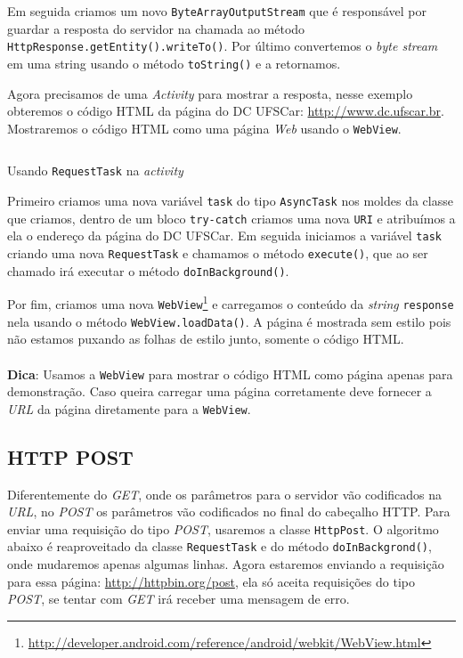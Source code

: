 \documentclass[a4paper,12pt,brazil,oneside]{book}
\begin{document}
\begin{singlespace}
		Em seguida criamos um novo \texttt{ByteArrayOutputStream} que é responsável por guardar a resposta do servidor na chamada ao método \texttt{HttpResponse.getEntity().writeTo()}. Por último convertemos o \emph{byte stream} em uma string usando o método \texttt{toString()} e a retornamos.

		Agora precisamos de uma \emph{Activity} para mostrar a resposta, nesse exemplo obteremos o código HTML da página do DC UFSCar: \href{http://www.dc.ufscar.br}{http://www.dc.ufscar.br}. Mostraremos o código HTML como uma página \emph{Web} usando o \texttt{WebView}.

		\begin{listing}[H]
		\inputminted[linenos=true,fontsize=\small,frame=lines, framesep=2mm, tabsize=2,numbersep=5pt]{java}{src/api/comm/httpget.java}
		\caption{Usando \texttt{RequestTask} na \emph{activity}}
		\label{code:requestactivity}
		\end{listing}		

		Primeiro criamos uma nova variável \texttt{task} do tipo \texttt{AsyncTask} nos moldes da classe que criamos, dentro de um bloco \texttt{try-catch} criamos uma nova \texttt{URI} e atribuímos a ela o endereço da página do DC UFSCar. Em seguida iniciamos a variável \texttt{task} criando uma nova \texttt{RequestTask} e chamamos o método \texttt{execute()}, que ao ser chamado irá executar o método \texttt{doInBackground()}. 
		
		Por fim, criamos uma nova \texttt{WebView}\footnote{\href{http://developer.android.com/reference/android/webkit/WebView.html}{http://developer.android.com/reference/android/webkit/WebView.html}} e carregamos o conteúdo da \emph{string} \texttt{response} nela usando o método \texttt{WebView.loadData()}. A página é mostrada sem estilo pois não estamos puxando as folhas de estilo junto, somente o código HTML.
		 
		 \begin{framed}
\paragraph{}\textbf{Dica}: Usamos a \texttt{WebView} para mostrar o código HTML como página apenas para demonstração. Caso queira carregar uma página corretamente deve fornecer a \emph{URL} da página diretamente para a \texttt{WebView}.
\textit{}
\end{framed}

		\subsection{HTTP POST}
		Diferentemente do \emph{GET}, onde os parâmetros para o servidor vão codificados na \emph{URL}, no \emph{POST} os parâmetros vão codificados no final do cabeçalho HTTP. Para enviar uma requisição do tipo \emph{POST}, usaremos a classe \texttt{HttpPost}. O algoritmo abaixo é reaproveitado da classe \texttt{RequestTask} e do método \texttt{doInBackgrond()}, onde mudaremos apenas algumas linhas. Agora estaremos enviando a requisição para essa página: \href{http://httpbin.org/post}{http://httpbin.org/post}, ela só aceita requisições do tipo \emph{POST}, se tentar com \emph{GET} irá receber uma mensagem de erro.


\end{singlespace}
\end{document}
